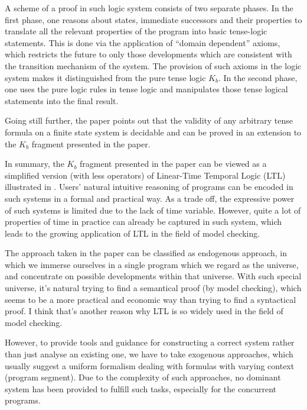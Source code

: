\documentclass{llncs}
\begin{document}
A scheme of a proof in such logic system consists of two separate phases. In
the first phase, one reasons about states, immediate successors and their
properties to translate all the relevant properties of the program into
basic tense-logic statements. This is done via the application of “domain
dependent” axioms, which restricts the future to only those developments
which are consistent with the transition mechanism of the system. The
provision of such axioms in the logic system makes it distinguished from the pure
tense logic $K_b$. In the second phase, one uses the pure logic rules in tense
logic and manipulates those tense logical statements into the final result.

Going still further, the paper points out that the validity of any arbitrary tense formula
on a finite state system is decidable and can be proved in an extension to the $K_b$ fragment
presented in the paper.

In summary, the $K_b$ fragment presented in the paper can be viewed as
a simplified version (with less operators) of Linear-Time Temporal Logic
(LTL) illustrated in \cite{Huth1999Logic}. Users' natural intuitive reasoning of programs
can be encoded in such systems in a formal and practical way. As a trade
off, the expressive power of such systems is limited due to the lack of time
variable. However, quite a lot of properties of time in practice can already
be captured in such system, which leads to the growing application of LTL
in the field of model checking.

The approach taken in the paper can be classified as endogenous approach,
in which we immerse ourselves in a single program which we regard as the
universe, and concentrate on possible developments within that universe. With
such special universe, it's natural trying to find a semantical proof
(by model checking), which seems to be a more practical and economic way
than trying to find a syntactical proof. I think that's another reason
why LTL is so widely used in the field of model checking.

However, to provide tools and guidance for constructing a correct system
rather than just analyse an existing one, we have to take exogenous approaches,
which usually suggest a uniform formalism dealing with formulas with varying
context (program segment). Due to the complexity of such approaches, no
dominant system has been provided to fulfill such tasks, especially for the
concurrent programs.

\newpage
\end{document}
